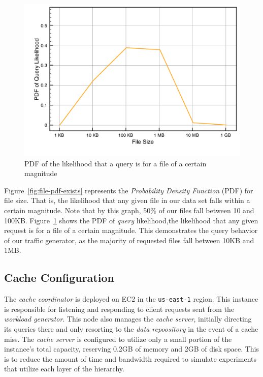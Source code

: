 \begin{figure}
\begin{center}
\includegraphics[scale=0.5]{figures/hierarchy-data-pdf-requests.pdf}
\end{center}
\caption{PDF of the likelihood that a query is for a file of a certain
magnitude}
\label{fig:file-pdf-requests}
\end{figure}

Figure~\ref{fig:file-pdf-exists} represents the \emph{Probability Density
Function} (PDF) for file size. That is, the likelihood that any given file in
our data set falls within a certain magnitude. Note that by this graph, 50\% of
our files fall between 10 and 100KB\@. Figure~\ref{fig:file-pdf-requests} shows
the PDF of \emph{query} likelihood,\ie the likelihood that any given request is
for a file of a certain magnitude. This demonstrates the query behavior of our
traffic generator, as the majority of requested files fall between 10KB and
1MB.

\subsection{Cache Configuration} %
\label{sub:cache_configuration}
The \emph{cache coordinator} is deployed on EC2 in the {\tt us-east-1} region.
This instance is responsible for listening and responding to client requests sent
from the \emph{workload generator}. This node also manages the \emph{cache
server}, initially directing its queries there and only resorting to the
\emph{data repoository} in the event of a cache miss. The \emph{cache server}
is configured to utilize only a small portion of the instance's total capacity,
reserving 0.2GB of memory and 2GB of disk space. This is to reduce the amount
of time and bandwidth required to simulate experiments that utilize each layer
of the hierarchy.

